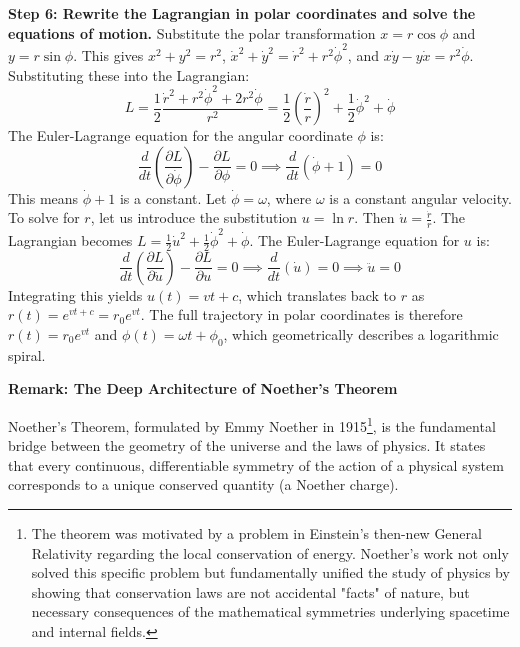 \begin{solution}
\textbf{Step 6: Rewrite the Lagrangian in polar coordinates and solve the equations of motion.}
Substitute the polar transformation $x = r\cos\phi$ and $y = r\sin\phi$. This gives $x^2+y^2 = r^2$, $\dot{x}^2+\dot{y}^2 = \dot{r}^2 + r^2\dot{\phi}^2$, and $x\dot{y} - y\dot{x} = r^2\dot{\phi}$.
Substituting these into the Lagrangian:
\begin{equation*}
    L = \frac{1}{2} \frac{\dot{r}^2 + r^2\dot{\phi}^2 + 2r^2\dot{\phi}}{r^2} = \frac{1}{2} \left( \frac{\dot{r}}{r} \right)^2 + \frac{1}{2} \dot{\phi}^2 + \dot{\phi}
\end{equation*}
The Euler-Lagrange equation for the angular coordinate $\phi$ is:
\begin{equation*}
    \frac{d}{dt} \left( \frac{\partial L}{\partial \dot{\phi}} \right) - \frac{\partial L}{\partial \phi} = 0 \implies \frac{d}{dt} (\dot{\phi} + 1) = 0
\end{equation*}
This means $\dot{\phi} + 1$ is a constant. Let $\dot{\phi} = \omega$, where $\omega$ is a constant angular velocity.
To solve for $r$, let us introduce the substitution $u = \ln r$. Then $\dot{u} = \frac{\dot{r}}{r}$. The Lagrangian becomes $L = \frac{1}{2}\dot{u}^2 + \frac{1}{2}\dot{\phi}^2 + \dot{\phi}$.
The Euler-Lagrange equation for $u$ is:
\begin{equation*}
    \frac{d}{dt} \left( \frac{\partial L}{\partial \dot{u}} \right) - \frac{\partial L}{\partial u} = 0 \implies \frac{d}{dt} (\dot{u}) = 0 \implies \ddot{u} = 0
\end{equation*}
Integrating this yields $u(t) = vt + c$, which translates back to $r$ as $r(t) = e^{vt+c} = r_0 e^{vt}$.
The full trajectory in polar coordinates is therefore $r(t) = r_0 e^{vt}$ and $\phi(t) = \omega t + \phi_0$, which geometrically describes a logarithmic spiral.
\end{solution}

\textbf{Remark: The Deep Architecture of Noether's Theorem}

Noether's Theorem, formulated by Emmy Noether in 1915\footnote{The theorem was motivated by a problem in Einstein's then-new General Relativity regarding the local conservation of energy. Noether's work not only solved this specific problem but fundamentally unified the study of physics by showing that conservation laws are not accidental "facts" of nature, but necessary consequences of the mathematical symmetries underlying spacetime and internal fields.}, is the fundamental bridge between the geometry of the universe and the laws of physics. It states that every continuous, differentiable symmetry of the action of a physical system corresponds to a unique conserved quantity (a Noether charge).

